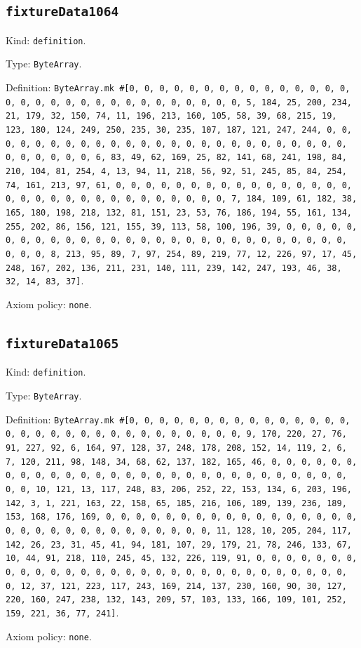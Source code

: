 \documentclass[11pt]{article}
\begin{document}
\subsection*{\texttt{fixtureData1064}}
\noindent Kind: \texttt{definition}.\par
\noindent Type: \texttt{ByteArray}.\par
\noindent Definition: \texttt{ByteArray.mk \#[0, 0, 0, 0, 0, 0, 0, 0, 0, 0, 0, 0, 0, 0, 0, 0, 0, 0, 0, 0, 0, 0, 0, 0, 0, 0, 0, 0, 0, 0, 0, 5, 184, 25, 200, 234, 21, 179, 32, 150, 74, 11, 196, 213, 160, 105, 58, 39, 68, 215, 19, 123, 180, 124, 249, 250, 235, 30, 235, 107, 187, 121, 247, 244, 0, 0, 0, 0, 0, 0, 0, 0, 0, 0, 0, 0, 0, 0, 0, 0, 0, 0, 0, 0, 0, 0, 0, 0, 0, 0, 0, 0, 0, 0, 0, 6, 83, 49, 62, 169, 25, 82, 141, 68, 241, 198, 84, 210, 104, 81, 254, 4, 13, 94, 11, 218, 56, 92, 51, 245, 85, 84, 254, 74, 161, 213, 97, 61, 0, 0, 0, 0, 0, 0, 0, 0, 0, 0, 0, 0, 0, 0, 0, 0, 0, 0, 0, 0, 0, 0, 0, 0, 0, 0, 0, 0, 0, 0, 0, 7, 184, 109, 61, 182, 38, 165, 180, 198, 218, 132, 81, 151, 23, 53, 76, 186, 194, 55, 161, 134, 255, 202, 86, 156, 121, 155, 39, 113, 58, 100, 196, 39, 0, 0, 0, 0, 0, 0, 0, 0, 0, 0, 0, 0, 0, 0, 0, 0, 0, 0, 0, 0, 0, 0, 0, 0, 0, 0, 0, 0, 0, 0, 0, 8, 213, 95, 89, 7, 97, 254, 89, 219, 77, 12, 226, 97, 17, 45, 248, 167, 202, 136, 211, 231, 140, 111, 239, 142, 247, 193, 46, 38, 32, 14, 83, 37]}.\par
\noindent Axiom policy: \texttt{none}.\par
\subsection*{\texttt{fixtureData1065}}
\noindent Kind: \texttt{definition}.\par
\noindent Type: \texttt{ByteArray}.\par
\noindent Definition: \texttt{ByteArray.mk \#[0, 0, 0, 0, 0, 0, 0, 0, 0, 0, 0, 0, 0, 0, 0, 0, 0, 0, 0, 0, 0, 0, 0, 0, 0, 0, 0, 0, 0, 0, 0, 9, 170, 220, 27, 76, 91, 227, 92, 6, 164, 97, 128, 37, 248, 178, 208, 152, 14, 119, 2, 6, 7, 120, 211, 98, 148, 34, 68, 62, 137, 182, 165, 46, 0, 0, 0, 0, 0, 0, 0, 0, 0, 0, 0, 0, 0, 0, 0, 0, 0, 0, 0, 0, 0, 0, 0, 0, 0, 0, 0, 0, 0, 0, 0, 10, 121, 13, 117, 248, 83, 206, 252, 22, 153, 134, 6, 203, 196, 142, 3, 1, 221, 163, 22, 158, 65, 185, 216, 106, 189, 139, 236, 189, 153, 168, 176, 169, 0, 0, 0, 0, 0, 0, 0, 0, 0, 0, 0, 0, 0, 0, 0, 0, 0, 0, 0, 0, 0, 0, 0, 0, 0, 0, 0, 0, 0, 0, 0, 11, 128, 10, 205, 204, 117, 142, 26, 23, 31, 45, 41, 94, 181, 107, 29, 179, 21, 78, 246, 133, 67, 10, 44, 91, 218, 110, 245, 45, 132, 226, 119, 91, 0, 0, 0, 0, 0, 0, 0, 0, 0, 0, 0, 0, 0, 0, 0, 0, 0, 0, 0, 0, 0, 0, 0, 0, 0, 0, 0, 0, 0, 0, 0, 12, 37, 121, 223, 117, 243, 169, 214, 137, 230, 160, 90, 30, 127, 220, 160, 247, 238, 132, 143, 209, 57, 103, 133, 166, 109, 101, 252, 159, 221, 36, 77, 241]}.\par
\noindent Axiom policy: \texttt{none}.\par
\end{document}
